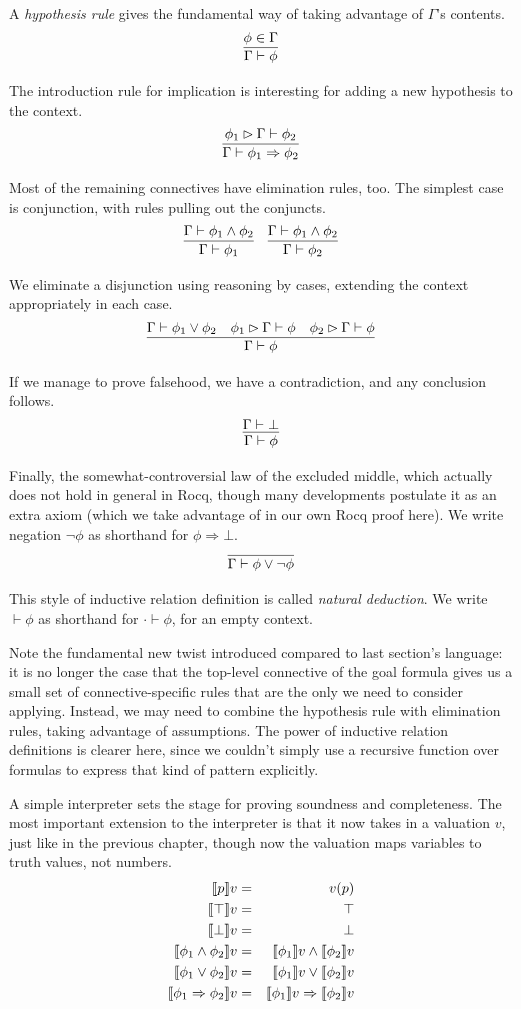 \documentclass{amsbook}
\theoremstyle{definition}
\theoremstyle{remark}
\numberwithin{section}{chapter}
\numberwithin{equation}{chapter}
\begin{document}
A \emph{hypothesis rule} gives the fundamental way of taking advantage of $\Gamma$'s contents.
$$\infer{\Gamma \vdash \phi}{
  \phi \in \Gamma
}$$

The introduction rule for implication is interesting for adding a new hypothesis to the context.
$$\infer{\Gamma \vdash \phi_1 \Rightarrow \phi_2}{
  \push{\phi_1}{\Gamma} \vdash \phi_2
}$$

Most of the remaining connectives have elimination rules, too.
The simplest case is conjunction, with rules pulling out the conjuncts.
$$\infer{\Gamma \vdash \phi_1}{
  \Gamma \vdash \phi_1 \land \phi_2
}
\quad \infer{\Gamma \vdash \phi_2}{
  \Gamma \vdash \phi_1 \land \phi_2
}$$

We eliminate a disjunction using reasoning by cases, extending the context appropriately in each case.
$$\infer{\Gamma \vdash \phi}{
  \Gamma \vdash \phi_1 \lor \phi_2
  & \push{\phi_1}{\Gamma} \vdash \phi
  & \push{\phi_2}{\Gamma} \vdash \phi
}$$

If we manage to prove falsehood, we have a contradiction, and any conclusion follows.
$$\infer{\Gamma \vdash \phi}{
  \Gamma \vdash \bot
}$$

Finally, the somewhat-controversial law of the excluded middle, which actually does not hold in general in Rocq, though many developments postulate it as an extra axiom (which we take advantage of in our own Rocq proof here).
We write negation $\neg \phi$ as shorthand for $\phi \Rightarrow \bot$.
$$\infer{\Gamma \vdash \phi \lor \neg \phi}{}$$

This style of inductive relation definition is called \emph{natural deduction}.
We write $\vdash \phi$ as shorthand for $\cdot \vdash \phi$, for an empty context.

Note the fundamental new twist introduced compared to last section's language: it is no longer the case that the top-level connective of the goal formula gives us a small set of connective-specific rules that are the only we need to consider applying.
Instead, we may need to combine the hypothesis rule with elimination rules, taking advantage of assumptions.
The power of inductive relation definitions is clearer here, since we couldn't simply use a recursive function over formulas to express that kind of pattern explicitly.

A simple interpreter sets the stage for proving soundness and completeness.
The most important extension to the interpreter is that it now takes in a valuation $v$, just like in the previous chapter, though now the valuation maps variables to truth values, not numbers.
\begin{eqnarray*}
  {\left \llbracket p \right \rrbracket}v &=& v(p) \\
  {\left \llbracket \top \right \rrbracket}v &=& \top \\
  {\left \llbracket \bot \right \rrbracket}v &=& \bot \\
  {\left \llbracket \phi_1 \land \phi_2 \right \rrbracket}v &=& {\left \llbracket \phi_1 \right \rrbracket}v \land {\left \llbracket \phi_2 \right \rrbracket}v \\
  {\left \llbracket \phi_1 \lor \phi_2 \right \rrbracket}v &=& {\left \llbracket \phi_1 \right \rrbracket}v \lor {\left \llbracket \phi_2 \right \rrbracket}v \\
  {\left \llbracket \phi_1 \Rightarrow \phi_2 \right \rrbracket}v &=& {\left \llbracket \phi_1 \right \rrbracket}v \Rightarrow {\left \llbracket \phi_2 \right \rrbracket}v
\end{eqnarray*}
\end{document}
